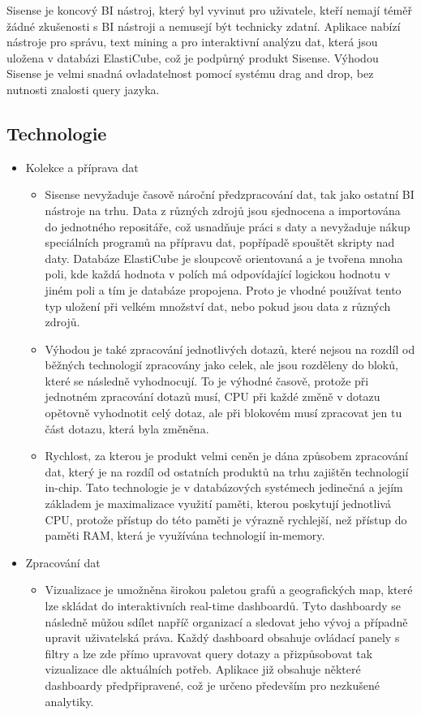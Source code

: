 \documentclass[czech,BP]{thesiskiv}
\begin{document}
 Sisense je koncový BI nástroj, který byl vyvinut pro uživatele, kteří nemají téměř žádné zkušenosti s BI nástroji a nemusejí být technicky zdatní. Aplikace nabízí nástroje pro správu, text mining a pro interaktivní analýzu dat, která jsou uložena v databázi ElastiCube, což je podpůrný produkt Sisense. Výhodou Sisense je velmi snadná ovladatelnost pomocí systému drag and drop, bez nutnosti znalosti query jazyka.
 \subsection{Technologie}
 
 \begin{itemize}
 	\item Kolekce a příprava dat
 	\begin{itemize}
 		\item Sisense nevyžaduje časově nároční předzpracování dat, tak jako ostatní BI nástroje na trhu. Data z různých zdrojů jsou sjednocena a importována do jednotného repositáře, což usnadňuje práci s daty a nevyžaduje nákup speciálních programů na přípravu dat, popřípadě spouštět skripty nad daty. Databáze ElastiCube je sloupcově orientovaná a je tvořena mnoha poli, kde každá hodnota v polích má odpovídající logickou hodnotu v jiném poli a tím je databáze propojena. Proto je vhodné používat tento typ uložení při velkém množství dat, nebo pokud jsou data z různých zdrojů.
 		
 		\item Výhodou je také zpracování jednotlivých dotazů, které nejsou na rozdíl od běžných technologií zpracovány jako celek, ale jsou rozděleny do bloků, které se následně vyhodnocují. To je výhodné časově, protože při jednotném zpracování dotazů musí, CPU při každé změně v dotazu opětovně vyhodnotit celý dotaz, ale při blokovém musí zpracovat jen tu část dotazu, která byla změněna.\cite{ElasticCube}
 		
 		\item Rychlost, za kterou je produkt velmi ceněn je dána způsobem zpracování dat, který je na rozdíl od ostatních produktů na trhu zajištěn technologií in-chip. Tato technologie je v databázových systémech jedinečná a jejím základem je maximalizace využití paměti, kterou poskytují jednotlivá CPU, protože přístup do této paměti je výrazně rychlejší, než přístup do paměti RAM, která je využívána technologií in-memory.
 		
 	\end{itemize}
 	\item Zpracování dat
 	\begin{itemize}
 		\item Vizualizace je umožněna širokou paletou grafů a geografických map, které lze skládat do interaktivních real-time dashboardů. Tyto dashboardy se následně můžou sdílet napříč organizací a sledovat jeho vývoj a případně upravit uživatelská práva. Každý dashboard obsahuje ovládací panely s filtry a lze zde přímo upravovat query dotazy a přizpůsobovat tak vizualizace dle aktuálních potřeb. Aplikace již obsahuje některé dashboardy předpřipravené, což je určeno především pro nezkušené analytiky.


\end{itemize}
\end{itemize}
\end{document}
